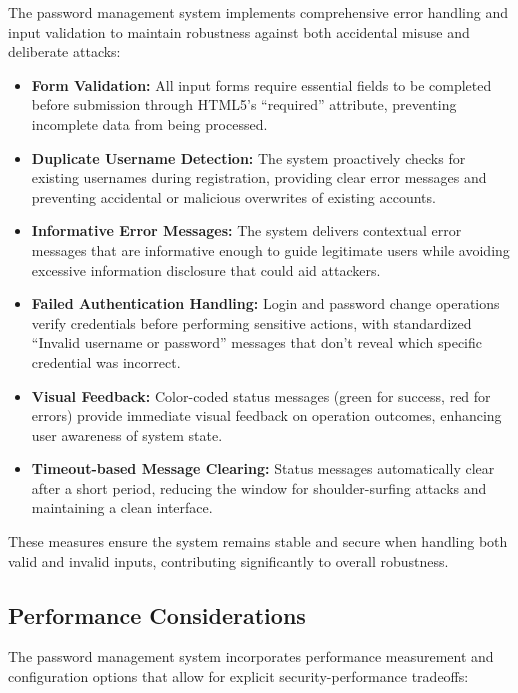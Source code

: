 \documentclass[11pt,a4paper]{article}
\begin{document}
The password management system implements comprehensive error handling and input validation to maintain robustness against both accidental misuse and deliberate attacks:

\begin{itemize}
   \item \textbf{Form Validation:} All input forms require essential fields to be completed before submission through HTML5's ``required'' attribute, preventing incomplete data from being processed.
   
   \item \textbf{Duplicate Username Detection:} The system proactively checks for existing usernames during registration, providing clear error messages and preventing accidental or malicious overwrites of existing accounts.
   
   \item \textbf{Informative Error Messages:} The system delivers contextual error messages that are informative enough to guide legitimate users while avoiding excessive information disclosure that could aid attackers.
   
   \item \textbf{Failed Authentication Handling:} Login and password change operations verify credentials before performing sensitive actions, with standardized ``Invalid username or password'' messages that don't reveal which specific credential was incorrect.
   
   \item \textbf{Visual Feedback:} Color-coded status messages (green for success, red for errors) provide immediate visual feedback on operation outcomes, enhancing user awareness of system state.
   
   \item \textbf{Timeout-based Message Clearing:} Status messages automatically clear after a short period, reducing the window for shoulder-surfing attacks and maintaining a clean interface.
\end{itemize}

These measures ensure the system remains stable and secure when handling both valid and invalid inputs, contributing significantly to overall robustness.

\subsection{Performance Considerations}

The password management system incorporates performance measurement and configuration options that allow for explicit security-performance tradeoffs:
\end{document}
